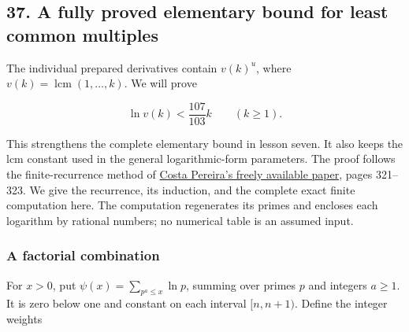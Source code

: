 \documentclass[
  11pt,
  a4paper,
]{article}
\begin{document}
\subsection{37. A fully proved elementary bound for least common
multiples}\label{a-fully-proved-elementary-bound-for-least-common-multiples}

The individual prepared derivatives contain \(v(k)^u\), where
\(v(k)=\operatorname{lcm}(1,\ldots,k)\). We will prove

\[
\ln v(k)<\frac{107}{103}k\qquad(k\ge1).
\tag{10.299}
\]

This strengthens the complete elementary bound in lesson seven. It also
keeps the lcm constant used in the general logarithmic-form parameters.
The proof follows the finite-recurrence method of
\href{https://www.impan.pl/shop/en/publication/transaction/download/product/106154}{Costa
Pereira's freely available paper}, pages 321--323. We give the
recurrence, its induction, and the complete exact finite computation
here. The computation regenerates its primes and encloses each logarithm
by rational numbers; no numerical table is an assumed input.

\subsubsection{A factorial combination}\label{a-factorial-combination}

For \(x>0\), put \(\psi(x)=\sum_{p^a\le x}\ln p\), summing over primes
\(p\) and integers \(a\ge1\). It is zero below one and constant on each
interval \([n,n+1)\). Define the integer weights
\end{document}
